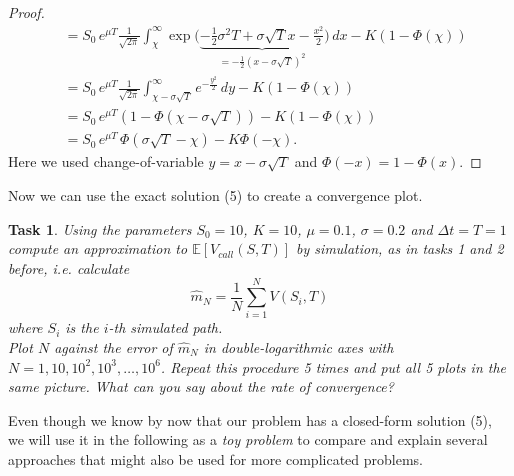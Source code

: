 \documentclass{scrartcl}
\newtheorem{task}{Task}
\begin{document}
\begin{proof}
\begin{align*}
			&= S_0\,e^{\mu T}\frac{1}{\sqrt{2\pi}}\int_{\chi}^{\infty} \exp\bigg(\underbrace{- \frac{1}{2}\sigma^2T + \sigma \sqrt{T} x -\frac{x^2}{2}}_{=-\frac{1}{2}\left(x-\sigma\sqrt{T}\right)^2}\bigg)\,dx - K(1-\Phi(\chi)) \\
			&= S_0\,e^{\mu T}\frac{1}{\sqrt{2\pi}}\int_{\chi-\sigma\sqrt{T}}^{\infty} e^{-\frac{y^2}{2}}\,dy - K(1-\Phi(\chi)) \\
			&= S_0\,e^{\mu T}\left(1-\Phi(\chi-\sigma\sqrt{T})\right) - K(1-\Phi(\chi)) \\
			&= S_0\,e^{\mu T}\,\Phi(\sigma\sqrt{T}-\chi)-K\Phi(-\chi)\text{.}
		\end{align*}
		Here we used change-of-variable $y = x - \sigma\sqrt{T}$ and $\Phi(-x) = 1 - \Phi(x)$.
	\end{proof}

	Now we can use the exact solution (5) to create a convergence plot.
	
	\begin{task}
		Using the parameters $S_0=10$, $K=10$, $\mu = 0.1$, $\sigma=0.2$ and $\Delta t=T=1$ compute an approximation to $\mathbb{E}\left[V_{call}(S, T)\right]$ by simulation, as in tasks 1 and 2 before, i.e. calculate
		\begin{equation*}
			\hat{m}_N = \frac{1}{N}\sum_{i=1}^{N}V(S_i, T)
		\end{equation*}
		where $S_i$ is the $i$-th simulated path.\\
		Plot $N$ against the error of $\hat{m}_N$ in double-logarithmic axes with $N = 1, 10, 10^2, 10^3,\dots, 10^6$. Repeat this procedure 5 times and put all 5 plots in the same picture. What can you say about the rate of convergence?
	\end{task}
	Even though we know by now that our problem has a closed-form solution (5), we will use it in the following as a \textit{toy problem} to compare and explain several approaches that might also be used for more complicated problems.
	
\end{document}

